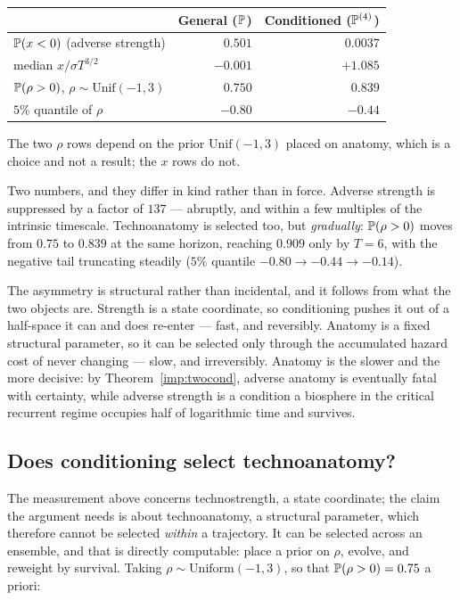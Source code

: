 \begin{center}\small
\begin{tabular}{@{}lrr@{}}
\toprule
& General ($\mathbb{P}$) & Conditioned ($\mathbb{P}^{(4)}$)\\
\midrule
$\mathbb{P}(x<0)$ (adverse strength) & $0.501$ & $0.0037$\\
median $x/\sigma T^{3/2}$ & $-0.001$ & $+1.085$\\
$\mathbb{P}(\rho>0)$, $\rho\sim\mathrm{Unif}(-1,3)$ & $0.750$ & $0.839$\\
$5\%$ quantile of $\rho$ & $-0.80$ & $-0.44$\\
\bottomrule
\end{tabular}
\end{center}

\noindent The two $\rho$ rows depend on the prior $\mathrm{Unif}(-1,3)$
placed on anatomy, which is a choice and not a result; the $x$ rows do
not.

\begin{remark}\label{gr:rem:truncresc}
Two numbers, and they differ in kind rather than in force.
Adverse strength is suppressed by a factor of $137$ --- abruptly, and
within a few multiples of the intrinsic timescale. Technoanatomy is
selected too, but \emph{gradually}: $\mathbb{P}(\rho>0)$ moves from $0.75$ to
$0.839$ at the same horizon, reaching $0.909$ only by $T=6$, with the
negative tail truncating steadily ($5\%$ quantile $-0.80\to-0.44\to
-0.14$).

The asymmetry is structural rather than incidental, and it follows from
what the two objects are. Strength is a state coordinate, so
conditioning pushes it out of a half-space it can and does re-enter ---
fast, and reversibly. Anatomy is a fixed structural parameter, so it can
be selected only through the accumulated hazard cost of never changing
--- slow, and irreversibly. Anatomy is the slower and the more decisive:
by Theorem~\ref{imp:twocond}, adverse anatomy is eventually fatal
with certainty, while adverse strength is a condition a biosphere in the critical
recurrent regime occupies half of logarithmic time and survives.

\end{remark}

\subsection{Does conditioning select technoanatomy?}
\label{gr:subsub:anatsel}

The measurement above concerns technostrength, a state coordinate; the
claim the argument needs is about technoanatomy, a structural parameter,
which therefore cannot be selected \emph{within} a trajectory. It can be
selected across an ensemble, and that is directly computable: place a
prior on $\rho$, evolve, and reweight by survival. Taking
$\rho\sim\mathrm{Uniform}(-1,3)$, so that $\mathbb{P}(\rho>0)=0.75$ a priori:

